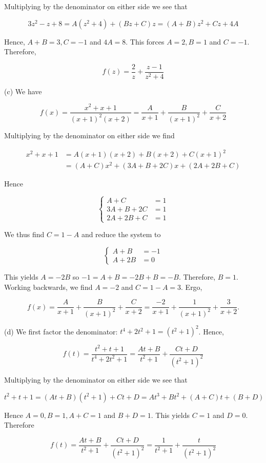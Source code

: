 \documentclass[10pt]{article}
\begin{document}
Multiplying by the denominator on either side we see that

$$
3 z^{2}-z+8=A\left(z^{2}+4\right)+(B z+C) z=(A+B) z^{2}+C z+4 A
$$

Hence, $A+B=3, C=-1$ and $4 A=8$. This forces $A=2, B=1$ and $C=-1$. Therefore,

$$
f(z)=\frac{2}{z}+\frac{z-1}{z^{2}+4}
$$

(c) We have

$$
f(x)=\frac{x^{2}+x+1}{(x+1)^{2}(x+2)}=\frac{A}{x+1}+\frac{B}{(x+1)^{2}}+\frac{C}{x+2}
$$

Multiplying by the denominator on either side we find

$$
\begin{aligned}
x^{2}+x+1 & =A(x+1)(x+2)+B(x+2)+C(x+1)^{2} \\
& =(A+C) x^{2}+(3 A+B+2 C) x+(2 A+2 B+C)
\end{aligned}
$$

Hence

$$
\left\{\begin{aligned}
A+C & =1 \\
3 A+B+2 C & =1 \\
2 A+2 B+C & =1
\end{aligned}\right.
$$

We thus find $C=1-A$ and reduce the system to

$$
\left\{\begin{aligned}
A+B & =-1 \\
A+2 B & =0
\end{aligned}\right.
$$

This yields $A=-2 B$ so $-1=A+B=-2 B+B=-B$. Therefore, $B=1$. Working backwards, we find $A=-2$ and $C=1-A=3$. Ergo,

$$
f(x)=\frac{A}{x+1}+\frac{B}{(x+1)^{2}}+\frac{C}{x+2}=\frac{-2}{x+1}+\frac{1}{(x+1)^{2}}+\frac{3}{x+2} .
$$

(d) We first factor the denominator: $t^{4}+2 t^{2}+1=\left(t^{2}+1\right)^{2}$. Hence,

$$
f(t)=\frac{t^{2}+t+1}{t^{4}+2 t^{2}+1}=\frac{A t+B}{t^{2}+1}+\frac{C t+D}{\left(t^{2}+1\right)^{2}}
$$

Multiplying by the denominator on either side we see that

$$
t^{2}+t+1=(A t+B)\left(t^{2}+1\right)+C t+D=A t^{3}+B t^{2}+(A+C) t+(B+D)
$$

Hence $A=0, B=1, A+C=1$ and $B+D=1$. This yields $C=1$ and $D=0$. Therefore

$$
f(t)=\frac{A t+B}{t^{2}+1}+\frac{C t+D}{\left(t^{2}+1\right)^{2}}=\frac{1}{t^{2}+1}+\frac{t}{\left(t^{2}+1\right)^{2}}
$$
\end{document}
